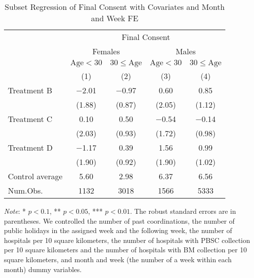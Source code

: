 \documentclass[12pt, a4paper]{article}
\begin{document}
\begin{table}[H]

\caption{\label{tab:consent-lm-subset2}Subset Regression of Final Consent with Covariates and Month and Week FE}
\centering
\fontsize{8}{10}\selectfont
\begin{threeparttable}
\begin{tabular}[t]{lcccc}
\toprule
\multicolumn{1}{c}{ } & \multicolumn{4}{c}{Final Consent} \\
\cmidrule(l{3pt}r{3pt}){2-5}
\multicolumn{1}{c}{ } & \multicolumn{2}{c}{Females} & \multicolumn{2}{c}{Males} \\
\cmidrule(l{3pt}r{3pt}){2-3} \cmidrule(l{3pt}r{3pt}){4-5}
\multicolumn{1}{c}{ } & \multicolumn{1}{c}{$\text{Age} < 30$} & \multicolumn{1}{c}{$30 \le \text{Age}$} & \multicolumn{1}{c}{$\text{Age} < 30$} & \multicolumn{1}{c}{$30 \le \text{Age}$} \\
\cmidrule(l{3pt}r{3pt}){2-2} \cmidrule(l{3pt}r{3pt}){3-3} \cmidrule(l{3pt}r{3pt}){4-4} \cmidrule(l{3pt}r{3pt}){5-5}
  & (1) & (2) & (3) & (4)\\
\midrule
Treatment B & \num{-2.01} & \num{-0.97} & \num{0.60} & \num{0.85}\\
 & (\num{1.88}) & (\num{0.87}) & (\num{2.05}) & (\num{1.12})\\
Treatment C & \num{0.10} & \num{0.50} & \num{-0.54} & \num{-0.14}\\
 & (\num{2.03}) & (\num{0.93}) & (\num{1.72}) & (\num{0.98})\\
Treatment D & \num{-1.17} & \num{0.39} & \num{1.56} & \num{0.99}\\
 & (\num{1.90}) & (\num{0.92}) & (\num{1.90}) & (\num{1.02})\\
\midrule
Control average & 5.60 & 2.98 & 6.37 & 6.56\\
Num.Obs. & \num{1132} & \num{3018} & \num{1566} & \num{5333}\\
\bottomrule
\end{tabular}
\begin{tablenotes}
\item \emph{Note}: * $p < 0.1$, ** $p < 0.05$, *** $p < 0.01$. The robust standard errors are in parentheses. We controlled the number of past coordinations, the number of public holidays in the assigned week and the following week, the number of hospitals per 10 square kilometers, the number of hospitals with PBSC collection per 10 square kilometers and the number of hospitals with BM collection per 10 square kilometers, and month and week (the number of a week within each month) dummy variables.
\end{tablenotes}
\end{threeparttable}
\end{table}
\end{document}
